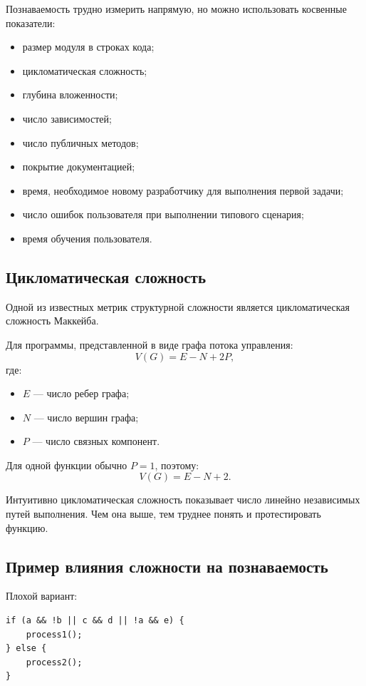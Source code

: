 \documentclass[12pt,a4paper]{article}
\begin{document}
Познаваемость трудно измерить напрямую, но можно использовать косвенные показатели:
\begin{itemize}
    \item размер модуля в строках кода;
    \item цикломатическая сложность;
    \item глубина вложенности;
    \item число зависимостей;
    \item число публичных методов;
    \item покрытие документацией;
    \item время, необходимое новому разработчику для выполнения первой задачи;
    \item число ошибок пользователя при выполнении типового сценария;
    \item время обучения пользователя.
\end{itemize}

\subsection{Цикломатическая сложность}

Одной из известных метрик структурной сложности является цикломатическая сложность Маккейба.

Для программы, представленной в виде графа потока управления:
\[
V(G) = E - N + 2P,
\]
где:
\begin{itemize}
    \item $E$ --- число ребер графа;
    \item $N$ --- число вершин графа;
    \item $P$ --- число связных компонент.
\end{itemize}

Для одной функции обычно $P = 1$, поэтому:
\[
V(G) = E - N + 2.
\]

Интуитивно цикломатическая сложность показывает число линейно независимых путей выполнения. Чем она выше, тем труднее понять и протестировать функцию.

\subsection{Пример влияния сложности на познаваемость}

Плохой вариант:

\begin{verbatim}
if (a && !b || c && d || !a && e) {
    process1();
} else {
    process2();
}
\end{verbatim}
\end{document}
